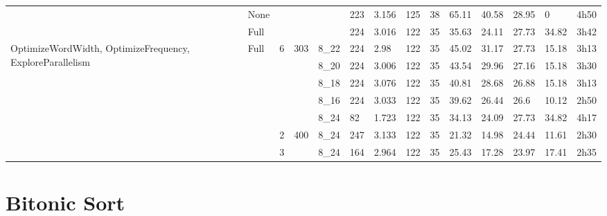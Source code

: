 \begin{table}
\begin{tabularx}{\textwidth}{p{3.5cm}|X|X|X|X|X|X|X|X|X|X|X|X|X|}
            & None        &     &          &       & 223             & 3.156          & 125                & 38                & 65.11    & 40.58  & 28.95     & 0        & 4h50       \\
            & Full        &     &          &       & 224             & 3.016          &	122                & 35                & 35.63    & 24.11  & 27.73     & 34.82    & 3h42       \\
            \hline
    \multirow{5}{2cm}{OptimizeWordWidth, OptimizeFrequency, ExploreParallelism}        & Full        & 6   & 303      & 8\_22 & 224             & 2.98           & 122                & 35                & 45.02    & 31.17  & 27.73     & 15.18    & 3h13       \\
            &             &     &          & 8\_20 & 224             & 3.006          &	122                & 35                & 43.54    & 29.96  & 27.16     & 15.18    & 3h30       \\
            &             &     &          & 8\_18 & 224             & 3.076          & 122                & 35                & 40.81    & 28.68  & 26.88     & 15.18    & 3h13       \\
            &             &     &          & 8\_16 & 224             & 3.033          & 122                & 35                & 39.62    & 26.44  & 26.6      & 10.12    & 2h50       \\
            &             &     &          & 8\_24 & 82              & 1.723          & 122                & 35                & 34.13    & 24.09  & 27.73     & 34.82    & 4h17       \\
            \hline
            &             & 2   & 400      & 8\_24 & 247             & 3.133          &	122                & 35                & 21.32    & 14.98  & 24.44     & 11.61    & 2h30       \\
            &             & 3   &          & 8\_24 & 164             & 2.964          & 122                & 35                & 25.43    & 17.28  & 23.97     & 17.41    & 2h35       \\

  \end{tabularx}
\end{table}









\section{Bitonic Sort}

